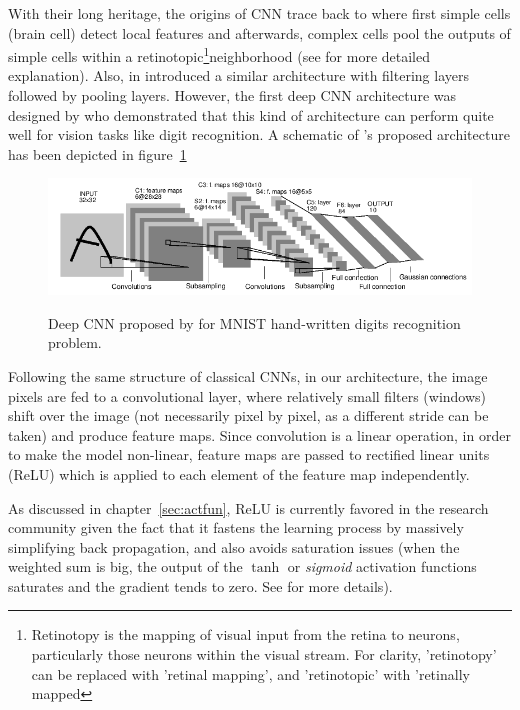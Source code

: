 With their long heritage, the origins of CNN trace back to \cite{hubel1962receptive} where first simple cells (brain cell) detect local features and afterwards, complex cells pool the outputs of simple cells within a retinotopic\footnote{Retinotopy is the mapping of visual input from the retina to neurons, particularly those neurons within the visual stream. For clarity, 'retinotopy' can be replaced with 'retinal mapping', and 'retinotopic' with 'retinally mapped}neighborhood (see \cite{hubel1962receptive} for more detailed explanation). Also, \citeauthor*{fukushima1975cognitron} in \cite{fukushima1975cognitron, fukushima1980neocognitron} introduced a similar architecture with filtering layers followed by pooling layers. However, the first deep CNN architecture was designed by \citet{lecun1989backpropagation} who demonstrated that this kind of architecture can perform quite well for vision tasks like digit recognition. A schematic of \citeauthor{lecun1989backpropagation}'s proposed architecture has been depicted in figure~\ref{fig:lecun}

\begin{figure}[H]
	\centering
	{\includegraphics[width=1\textwidth]{images/lenetarch}}
	\caption{Deep CNN proposed by \citet{lecun1989backpropagation} for MNIST hand-written digits recognition problem.}
	\label{fig:lecun}
\end{figure}

Following the same structure of classical CNNs, in our architecture, the image pixels are fed to a convolutional layer, where relatively small filters (windows) shift over the image (not necessarily pixel by pixel, as a different stride can be taken) and produce feature maps. Since convolution is a linear operation, in order to make the model non-linear, feature maps are passed to rectified linear units (ReLU) \cite{nair2010rectified} which is applied to each element of the feature map independently. 

As discussed in chapter~\ref{sec:actfun}, ReLU is currently favored in the research community given the fact that it fastens the learning process by massively simplifying back propagation, and also avoids saturation issues (when the weighted sum is big, the output of the $\tanh$ or \textit{sigmoid} activation functions saturates and the gradient tends to zero. See \cite{hansen1990neural, amit1987statistical} for more details). 


